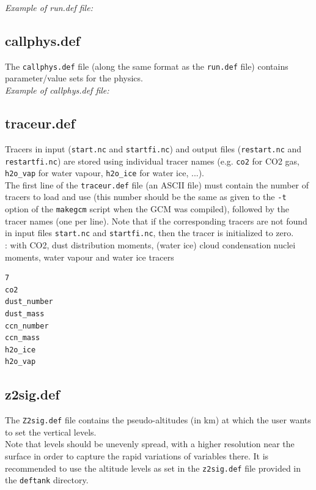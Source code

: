 \noindent
{\it Example of run.def file: }
{\footnotesize

}


\subsection{callphys.def}
\label{sc:callphys.def}
The {\tt callphys.def} file (along the same format
as the {\tt run.def} file) contains parameter/value sets
for the physics.\\

 
\noindent
{\it Example of callphys.def file: }
{\footnotesize

}

\subsection{traceur.def}
\label{sc:traceur.def}
Tracers in input ({\tt start.nc} and {\tt startfi.nc}) and output
files ({\tt restart.nc} and {\tt restartfi.nc}) are stored using
individual tracer names (e.g. {\tt co2} for CO2 gas, {\tt h2o\_vap}
for water vapour, {\tt h2o\_ice} for water ice, ...).\\
The first line of the {\tt traceur.def} file (an ASCII file) must
contain the number of tracers to load and use (this number should
be the same as given to the {\tt -t} option of the {\tt makegcm}
script when the GCM was compiled), followed by the tracer names
(one per line). Note that if the corresponding tracers are not
found in input files {\tt start.nc} and {\tt startfi.nc}, then the
tracer is initialized to zero.\\


:
with CO2, dust distribution moments, (water ice) cloud condensation nuclei moments, water vapour and water ice tracers
{\footnotesize
\begin{verbatim}
7
co2
dust_number
dust_mass
ccn_number
ccn_mass
h2o_ice
h2o_vap
\end{verbatim}
}

\subsection{z2sig.def}
The {\tt Z2sig.def} file contains the pseudo-altitudes
(in km) at which the user wants to set the vertical levels.\\
Note that levels should be unevenly spread, with a higher resolution
near the surface in order to capture the rapid variations of variables
there. It is recommended to use the altitude levels as set in the
{\tt z2sig.def} file provided in the {\tt deftank} directory.\\


